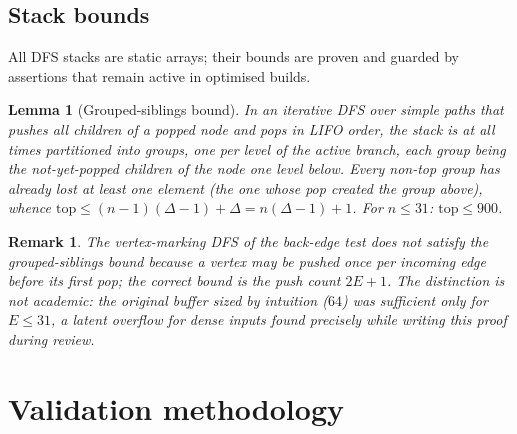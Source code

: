 \documentclass[11pt]{article}
\newtheorem{lemma}[theorem]{Lemma}
\newtheorem{remark}[theorem]{Remark}
\begin{document}
\subsection{Stack bounds}

All DFS stacks are static arrays; their bounds are proven and guarded by assertions that remain active in
optimised builds.

\begin{lemma}[Grouped-siblings bound]
In an iterative DFS over \emph{simple paths} that pushes all
children of a popped node and pops in LIFO order, the stack is at
all times partitioned into groups, one per level of the active
branch, each group being the not-yet-popped children of the node one
level below. Every non-top group has already lost at least one
element (the one whose pop created the group above), whence
$\mathrm{top} \le (n-1)(\Delta-1) + \Delta = n(\Delta-1)+1$.
For $n \le 31$: $\mathrm{top} \le 900$.
\end{lemma}

\begin{remark}
The vertex-marking DFS of the back-edge test does \emph{not} satisfy
the grouped-siblings bound because a vertex may be pushed once per
incoming edge before its first pop; the correct bound is the push
count $2E+1$. The distinction is not academic: the original buffer
sized by intuition ($64$) was sufficient only for $E \le 31$, a
latent overflow for dense inputs found precisely while writing this
proof during review.
\end{remark}

\section{Validation methodology}
\end{document}
